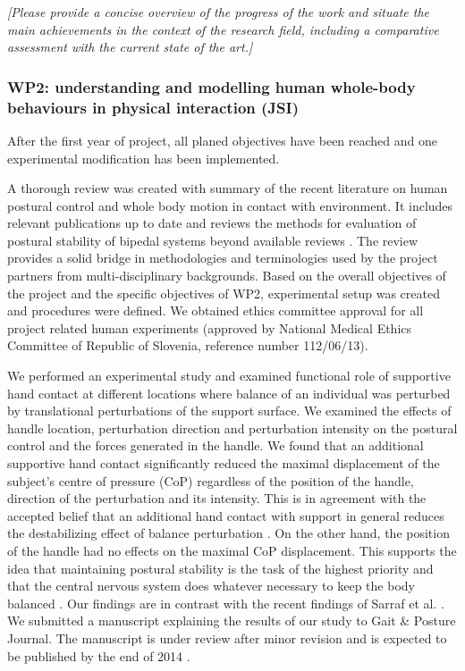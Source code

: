 \documentclass[12pt,a4paper,twoside]{article}
\begin{document}
\emph{\color{red}[Please provide a concise overview of the progress of the work and situate the main achievements in the context of the research field, including a comparative assessment with the current state of the art.]}

\subsubsection{WP2: understanding and modelling human whole-body behaviours in physical interaction (JSI)}

After the first year of project, all planed objectives have been reached and one experimental modification has been implemented.

A thorough review was created with summary of the recent literature on human postural control and whole body motion in contact with environment. It includes relevant publications up to date and reviews the methods for evaluation of postural stability of bipedal systems beyond available reviews \cite{Mergner2007, Azevedo2007}. The review provides a solid bridge in methodologies and terminologies used by the project partners from multi-disciplinary backgrounds. Based on the overall objectives of the project and the specific objectives of WP2, experimental setup was created and procedures were defined. We obtained ethics committee approval for all project related human experiments (approved by National Medical Ethics Committee of Republic of Slovenia, reference number 112/06/13).

We performed an experimental study and examined functional role of supportive hand contact at different locations where balance of an individual was perturbed by translational perturbations of the support surface. We examined the effects of handle location, perturbation direction and perturbation intensity on the postural control and the forces generated in the handle. We found that an additional supportive hand contact significantly reduced the maximal displacement of the subject's centre of pressure (CoP) regardless of the position of the handle, direction of the perturbation and its intensity. This is in agreement with the accepted belief that an additional hand contact with support in general reduces the destabilizing effect of balance perturbation \cite{Maki1997, Bateni2005, Maki2006, Wing2011}. On the other hand, the position of the handle had no effects on the maximal CoP displacement. This supports the idea that maintaining postural stability is the task of the highest priority and that the central nervous system does whatever necessary to keep the body balanced \cite{Winter1995}. Our findings are in contrast with the recent findings of Sarraf et al. \cite{Sarraf2014}. We submitted a manuscript explaining the results of our study to Gait \& Posture Journal. The manuscript is under review after minor revision and is expected to be published by the end of 2014 \cite{Babic2014}.
\end{document}
